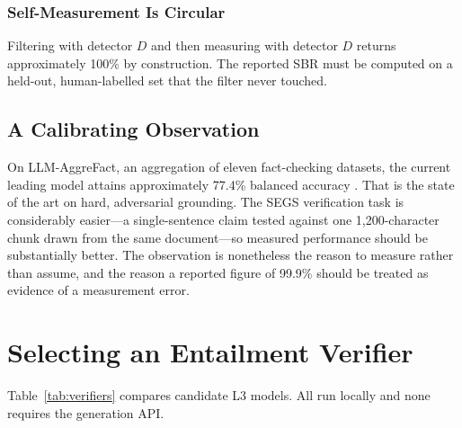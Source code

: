 \documentclass[stu,11pt,floatsintext]{apa7}
\begin{document}
\subsubsection{Self-Measurement Is Circular} Filtering with detector $D$ and then
measuring with detector $D$ returns approximately 100\% by construction. The
reported SBR must be computed on a held-out, human-labelled set that the filter
never touched.

\subsection{A Calibrating Observation}

On LLM-AggreFact, an aggregation of eleven fact-checking datasets, the current
leading model attains approximately 77.4\% balanced accuracy
\parencite{bespoke2024minicheck}. That is the state of the art on hard,
adversarial grounding. The SEGS verification task is considerably easier---a
single-sentence claim tested against one 1,200-character chunk drawn from the
same document---so measured performance should be substantially better. The
observation is nonetheless the reason to measure rather than assume, and the
reason a reported figure of 99.9\% should be treated as evidence of a
measurement error.

\section{Selecting an Entailment Verifier}

Table~\ref{tab:verifiers} compares candidate L3 models. All run locally and none
requires the generation API.
\end{document}
